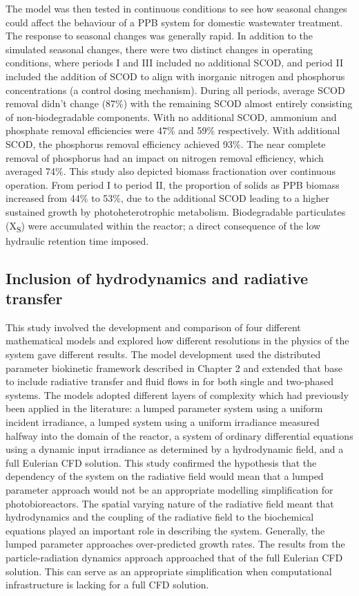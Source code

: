\skippingparagraph
The model was then tested in continuous conditions to see how seasonal changes could affect the behaviour of a PPB system for domestic wastewater treatment. The response to seasonal changes was generally rapid. In addition to the simulated seasonal changes, there were two distinct changes in operating conditions, where periods I and III included no additional SCOD, and period II included the addition of SCOD to align with inorganic nitrogen and phosphorus concentrations (a control dosing mechanism). During all periods, average SCOD removal didn't change (87\%) with the remaining SCOD almost entirely consisting of non-biodegradable components. With no additional SCOD, ammonium and phosphate removal efficiencies were 47\% and 59\% respectively. With additional SCOD, the phosphorus removal efficiency achieved 93\%. The near complete removal of phosphorus had an impact on nitrogen removal efficiency, which averaged 74\%. This study also depicted biomass fractionation over continuous operation. From period I to period II, the proportion of solids as PPB biomass increased from 44\% to 53\%, due to the additional SCOD leading to a higher sustained growth by photoheterotrophic metabolism. Biodegradable particulates (X\textsubscript{S}) were accumulated within the reactor; a direct consequence of the low hydraulic retention time imposed. 



\subsection{Inclusion of hydrodynamics and radiative transfer}
This study involved the development and comparison of four different mathematical models and explored how different resolutions in the physics of the system gave different results. The model development used the distributed parameter biokinetic framework described in Chapter 2 and extended that base to include radiative transfer and fluid flows in for both single and two-phased systems. 
\skippingparagraph
The models adopted different layers of complexity which had previously been applied in the literature: a lumped parameter system using a uniform incident irradiance, a lumped system using a uniform irradiance measured halfway into the domain of the reactor, a system of ordinary differential equations using a dynamic input irradiance as determined by a hydrodynamic field, and a full Eulerian CFD solution. 
\skippingparagraph
This study confirmed the hypothesis that the dependency of the system on the radiative field would mean that a lumped parameter approach would not be an appropriate modelling simplification for photobioreactors. The spatial varying nature of the radiative field meant that hydrodynamics and the coupling of the radiative field to the biochemical equations played an important role in describing the system. Generally, the lumped parameter approaches over-predicted growth rates. The results from the particle-radiation dynamics approach approached that of the full Eulerian CFD solution. This can serve as an appropriate simplification when computational infrastructure is lacking for a full CFD solution. 

